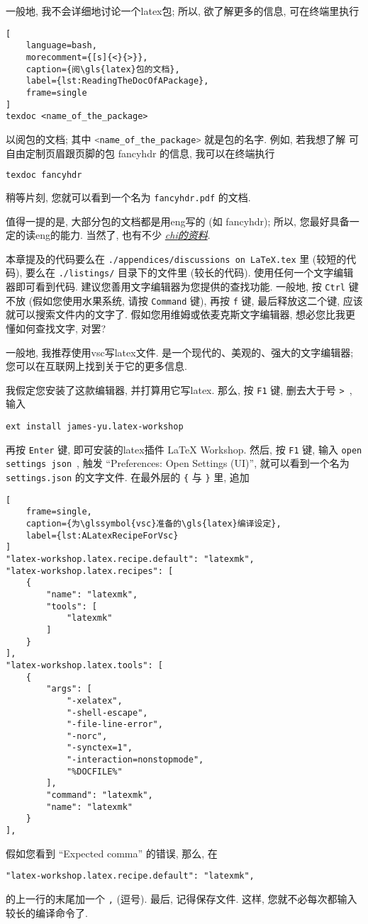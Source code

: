 一般地, 我不会详细地讨论一个\gls{latex}包;
所以, 欲了解更多的信息, 可在终端里执行
\begin{lstlisting}[
    language=bash,
    morecomment={[s]{<}{>}},
    caption={阅\gls{latex}包的文档},
    label={lst:ReadingTheDocOfAPackage},
    frame=single
]
texdoc <name_of_the_package>
\end{lstlisting}
以阅包的文档;
其中
\lstinline[language=bash,morecomment={[s]{<}{>}}]`<name_of_the_package>`
就是包的名字.
例如,
若我想了解%
可自由定制页眉跟页脚的包 \textsf{fancyhdr} 的信息,
我可以在终端执行
\begin{lstlisting}[language=bash,morecomment={[s]{<}{>}}]
texdoc fancyhdr
\end{lstlisting}
稍等片刻, 您就可以看到一个名为 \verb`fancyhdr.pdf` 的文档.

值得一提的是,
大部分包的文档都是用\gls{eng}写的 (如 \textsf{fancyhdr});
所以, 您最好具备一定的读\gls{eng}的能力.
当然了, 也有不少%
\href{https://ctan.org/topic/chinese-doc}{\emph{\gls{chi}的资料}}.

本章提及的代码要么在
\verb`./appendices/discussions on LaTeX.tex` 里 (较短的代码),
要么在 \verb`./listings/` 目录下的文件里 (较长的代码).
使用任何一个文字编辑器即可看到代码.
建议您善用文字编辑器为您提供的查找功能.
一般地, 按 \verb`Ctrl` 键不放
(假如您使用水果系统, 请按 \verb`Command` 键),
再按 \verb`f` 键, 最后释放这二个键,
应该就可以搜索文件内的文字了.
假如您用维姆或依麦克斯文字编辑器,
想必您比我更懂如何查找文字, 对罢?

一般地, 我推荐使用\gls{vsc}写\gls{latex}文件.
是一个现代的、美观的、强大的文字编辑器;
您可以在互联网上找到关于它的更多信息.

我假定您安装了这款编辑器, 并打算用它写\gls{latex}.
那么, 按 \verb`F1` 键, 删去大于号 \verb`>`~, 输入
\begin{lstlisting}
ext install james-yu.latex-workshop
\end{lstlisting}
再按 \verb`Enter` 键,
即可安装的\gls{latex}插件 LaTeX Workshop.
然后, 按 \verb`F1` 键, 输入 \verb`open settings json`~,
触发 ``Preferences: Open Settings (UI)'',
就可以看到一个名为 \verb`settings.json` 的文字文件.
在最外层的 \verb`{` 与 \verb`}` 里, 追加
\begin{lstlisting}[
    frame=single,
    caption={为\glssymbol{vsc}准备的\gls{latex}编译设定},
    label={lst:ALatexRecipeForVsc}
]
"latex-workshop.latex.recipe.default": "latexmk",
"latex-workshop.latex.recipes": [
    {
        "name": "latexmk",
        "tools": [
            "latexmk"
        ]
    }
],
"latex-workshop.latex.tools": [
    {
        "args": [
            "-xelatex",
            "-shell-escape",
            "-file-line-error",
            "-norc",
            "-synctex=1",
            "-interaction=nonstopmode",
            "%DOCFILE%"
        ],
        "command": "latexmk",
        "name": "latexmk"
    }
],
\end{lstlisting}
假如您看到 ``Expected comma'' 的错误, 那么, 在
\begin{lstlisting}
"latex-workshop.latex.recipe.default": "latexmk",
\end{lstlisting}
的上一行的末尾加一个 \verb`,` (逗号).
最后, 记得保存文件.
这样, 您就不必每次都输入较长的编译命令了.

